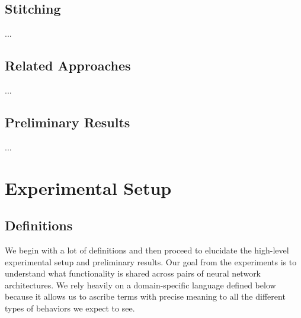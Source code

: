 \documentclass{article} %
\begin{document}
\subsection{Stitching}
...

\subsection{Related Approaches}
...

\subsection{Preliminary Results}
...

% 
% 
\section{Experimental Setup}
\subsection{Definitions}
We begin with a lot of definitions and then proceed to elucidate the high-level experimental setup
and preliminary results. Our goal from the experiments is to understand what functionality is shared
across pairs of neural network architectures. We rely heavily on a domain-specific language defined
below because it allows us to ascribe terms with precise meaning to all the different types of behaviors
we expect to see.
\end{document}
